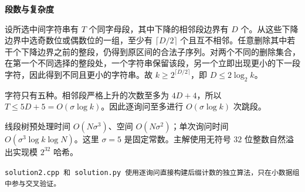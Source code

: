 \textbf{段数与复杂度}

设所选中间字符串有 $T$ 个同字母段，其中下降的相邻段边界有 $D$ 个。从这些下降边界中选奇数位或偶数位的一组，至少有 $\lceil D/2\rceil$ 个且互不相邻。任意删除其中若干个下降边界之前的整段，仍得到原区间的合法子序列。对两个不同的删除集合，在第一个不同选择的整段处，一个字符串保留该段，另一个立即出现更小的下一段字符，因此得到不同且更小的字符串。故 $k\ge2^{\lceil D/2\rceil}$，即 $D\le2\log_2 k$。

字符只有五种。相邻段严格上升的次数至多为 $4D+4$，所以 $T\le5D+5=O(\sigma\log k)$。因此逐询问至多进行 $O(\sigma\log k)$ 次跳段。

线段树预处理时间 $O(N\sigma^3)$、空间 $O(N\sigma^2)$；单次询问时间 $O(\sigma^3\log k\log N)$。这里 $\sigma=5$ 是固定常数。主解使用无符号 $32$ 位整数自然溢出实现模 $2^{32}$ 哈希。

\tt{solution2.cpp} 和 \tt{solution.py} 使用逐询问直接构建后缀计数的独立算法，只在小数据组中参与交叉验证。
